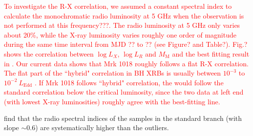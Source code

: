 \documentclass[twocolumn]{aastex63}
\begin{document}
\textcolor{red}{To investigate the R-X correlation, we assumed a constant spectral index to calculate the monochromatic radio luminosity at 5 GHz when the observation is not performed at this frequency???. The radio luminosity at 5 GHz only varies about 20\%, while the X-ray luminosity varies roughly one order of magnitude during the same time interval from MJD ?? to ?? (see Figure? and Table?). Fig.? shows the correlation between $\log L_{X}$, $\log L_{R}$ and $M_\mathrm{M}$ and the best fitting result in \citet{Plotkin2012}. Our current data shows that Mrk 1018 roughly follows a flat R-X correlation. The flat part of the ``hybrid" correlation in BH XRBs is usually between $10^{-3}$ to $10^{-2}~L_\mathrm{Edd}$ \citep[see e.g. ][]{Espinasse2018,Xie2020}. If Mrk 1018 follows ``hybrid" correlation, the would follow the standard correlation below the critical luminosity, since the two data at left end (with lowest X-ray luminosities) roughly agree with the best-fitting line.  }

\citet{2018MNRAS.473.4122E} find that the radio spectral indices of the samples in the standard branch (with slope $\sim 0.6$) are systematically higher than the outliers. 





\end{document}
